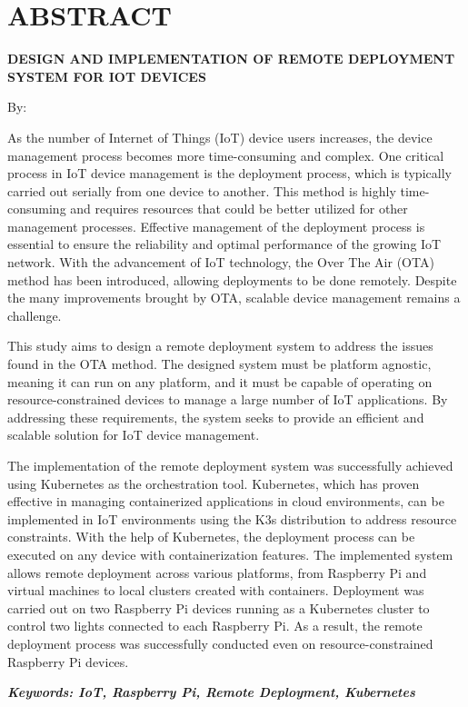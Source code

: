 \clearpage
\chapter*{ABSTRACT}

\begin{center}
  \center
  \begin{singlespace}
    \large\bfseries\MakeUppercase{Design and Implementation of Remote Deployment System for IoT Devices}
    
    \normalfont\normalsize
    By:
    
    \bfseries \theauthor
  \end{singlespace}
\end{center}


\begin{singlespace}
  \small
  As the number of Internet of Things (IoT) device users increases, the device management process becomes more time-consuming and complex. One critical process in IoT device management is the deployment process, which is typically carried out serially from one device to another. This method is highly time-consuming and requires resources that could be better utilized for other management processes. Effective management of the deployment process is essential to ensure the reliability and optimal performance of the growing IoT network. With the advancement of IoT technology, the Over The Air (OTA) method has been introduced, allowing deployments to be done remotely. Despite the many improvements brought by OTA, scalable device management remains a challenge.
  
  This study aims to design a remote deployment system to address the issues found in the OTA method. The designed system must be platform agnostic, meaning it can run on any platform, and it must be capable of operating on resource-constrained devices to manage a large number of IoT applications. By addressing these requirements, the system seeks to provide an efficient and scalable solution for IoT device management.
  
  The implementation of the remote deployment system was successfully achieved using Kubernetes as the orchestration tool. Kubernetes, which has proven effective in managing containerized applications in cloud environments, can be implemented in IoT environments using the K3s distribution to address resource constraints. With the help of Kubernetes, the deployment process can be executed on any device with containerization features. The implemented system allows remote deployment across various platforms, from Raspberry Pi and virtual machines to local clusters created with containers. Deployment was carried out on two Raspberry Pi devices running as a Kubernetes cluster to control two lights connected to each Raspberry Pi. As a result, the remote deployment process was successfully conducted even on resource-constrained Raspberry Pi devices.
  
  \textbf{\textit{Keywords: IoT, Raspberry Pi, Remote Deployment, Kubernetes }}
\end{singlespace}
\clearpage

\clearpage